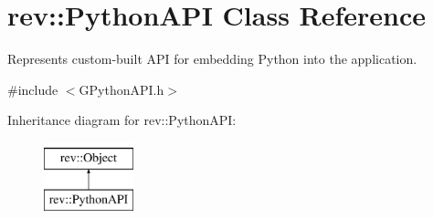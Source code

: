 \hypertarget{classrev_1_1_python_a_p_i}{}\section{rev\+::Python\+A\+PI Class Reference}
\label{classrev_1_1_python_a_p_i}


Represents custom-\/built A\+PI for embedding Python into the application.  




{\ttfamily \#include $<$G\+Python\+A\+P\+I.\+h$>$}

Inheritance diagram for rev\+::Python\+A\+PI\+:\begin{figure}[H]
\begin{center}
\leavevmode
\includegraphics[height=2.000000cm]{classrev_1_1_python_a_p_i}
\end{center}
\end{figure}
